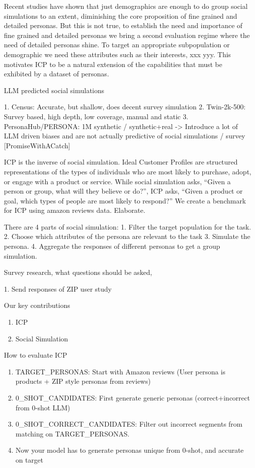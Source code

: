 Recent studies have shown that just demographics are enough to do group social simulations to an extent, diminishing the core proposition of fine grained and detailed personas. But this is not true, to establish the need and importance of fine grained and detailed personas we bring a second evaluation regime where the need of detailed personas shine. To target an appropriate subpopulation or demographic we need these attributes such as their interests, xxx yyy. 
This motivates ICP to be a natural extension of the capabilities that must be exhibited by a dataset of personas.

LLM predicted social simulations

1. Census: Accurate, but shallow, does decent survey simulation
2. Twin-2k-500: Survey based, high depth, low coverage, manual and static 
3. PersonaHub/PERSONA: 1M synthetic / synthetic+real -> Introduce a lot of LLM driven biases and are not actually predictive of social simulations / survey [PromiseWithACatch]

ICP is the inverse of social simulation. Ideal Customer Profiles are structured representations of the types of individuals who are most likely to purchase, adopt, or engage with a product or service. While social simulation asks, “Given a person or group, what will they believe or do?”, ICP asks, “Given a product or goal, which types of people are most likely to respond?” We create a benchmark for ICP using amazon reviews data. Elaborate.

There are 4 parts of social simulation:
1. Filter the target population for the task.
2. Choose which attributes of the persona are relevant to the task
3. Simulate the persona.
4. Aggregate the responses of different personas to get a group simulation.

Survey research, what questions should be asked,


1. Send responses of ZIP user study

Our key contributions
\begin{enumerate}
    \item ICP
    \item Social Simulation
\end{enumerate}

How to evaluate ICP
\begin{enumerate}
    \item TARGET\_PERSONAS: Start with Amazon reviews (User persona is products + ZIP style personas from reviews)
    \item 0\_SHOT\_CANDIDATES: First generate generic personas (correct+incorrect from 0-shot LLM)
    \item 0\_SHOT\_CORRECT\_CANDIDATES: Filter out incorrect segments from matching on TARGET\_PERSONAS.
    \item Now your model has to generate personas unique from 0-shot, and accurate on target
\end{enumerate}

